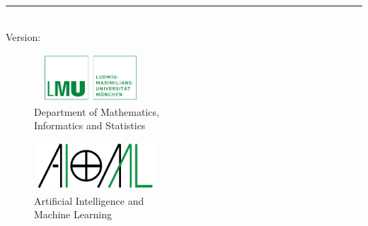 %
\begin{titlepage}
	\flushright
	\hfill
	\vfill
	{\LARGE\thesisTitle \par}
	\rule[5pt]{\textwidth}{.4pt} \par
	{\Large\thesisName}
	\vfill
	\textit{\large\thesisDate} \\
	Version: \thesisVersion
\end{titlepage}


\begin{titlepage}
	\tgherosfont
	
	
	\begin{figure}
	\begin{minipage}[t]{8.5cm}		
	\includegraphics[height=1.8cm,width=4.25cm]{gfx/lmulogo.pdf}\\
	\textsf{\small{Department of Mathematics,  \\ Informatics and Statistics \\
		\thesisUniversityInstitute
		}}
	\end{minipage}
	\hfill
	\begin{minipage}[t]{4.7cm}
	\includegraphics[height=1.8cm,width=4.7cm]{gfx/aiml-logo-solid-black.pdf}\\
	\textsf{%
	\hspace*{0.1cm}\small{Artificial Intelligence and \\ \hspace*{0.1cm}Machine Learning}
	}
	\end{minipage}
	\end{figure}
	
	\centering


\end{titlepage}
